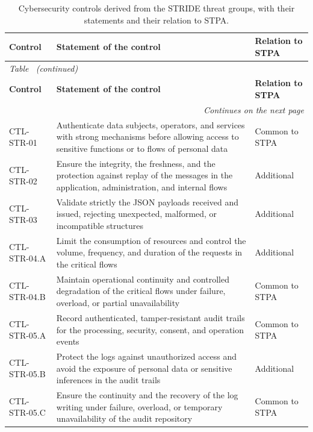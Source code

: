 \begin{longtable}{l p{} p{}}
    \caption[Cybersecurity controls derived from the STRIDE threat groups]{Cybersecurity controls derived from the STRIDE threat groups, with their statements and their relation to STPA.}
    \label{tab:apxB_controles} \\
    \hline
    \textbf{Control} & \textbf{Statement of the control} & \textbf{Relation to STPA} \\
    \hline
    \endfirsthead
    \multicolumn{3}{l}{\small\emph{Table~\thetable{} (continued)}} \\
    \hline
    \textbf{Control} & \textbf{Statement of the control} & \textbf{Relation to STPA} \\
    \hline
    \endhead
    \hline
    \multicolumn{3}{r}{\small\emph{Continues on the next page}} \\
    \endfoot
    \hline
    \endlastfoot
        CTL-STR-01 & Authenticate data subjects, operators, and services with strong mechanisms before allowing access to sensitive functions or to flows of personal data & Common to STPA \\[0.4em]
        CTL-STR-02 & Ensure the integrity, the freshness, and the protection against replay of the messages in the application, administration, and internal flows & Additional \\[0.4em]
        CTL-STR-03 & Validate strictly the JSON payloads received and issued, rejecting unexpected, malformed, or incompatible structures & Additional \\[0.4em]
        CTL-STR-04.A & Limit the consumption of resources and control the volume, frequency, and duration of the requests in the critical flows & Additional \\[0.4em]
        CTL-STR-04.B & Maintain operational continuity and controlled degradation of the critical flows under failure, overload, or partial unavailability & Common to STPA \\[0.4em]
        CTL-STR-05.A & Record authenticated, tamper-resistant audit trails for the processing, security, consent, and operation events & Common to STPA \\[0.4em]
        CTL-STR-05.B & Protect the logs against unauthorized access and avoid the exposure of personal data or sensitive inferences in the audit trails & Additional \\[0.4em]
        CTL-STR-05.C & Ensure the continuity and the recovery of the log writing under failure, overload, or temporary unavailability of the audit repository & Common to STPA \\[0.4em]

\end{longtable}
